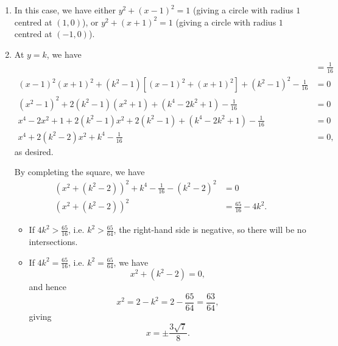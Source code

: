 \Question{\currfilebase}

\begin{enumerate}
    \item In this case, we have either \(y^2 + (x - 1)^2 = 1\) (giving a circle with radius \(1\) centred at \((1, 0)\)), or \(y^2 + (x + 1)^2 = 1\) (giving a circle with radius \(1\) centred at \((-1, 0)\)).
          \begin{center}
              
          \end{center}

    \item At \(y = k\), we have
          \begin{align*}
              [(x - 1)^2 + (k^2 - 1)] [(x + 1)^2 + (k^2 - 1)]                                      & = \frac{1}{16} \\
              (x - 1)^2 (x + 1)^2 + (k^2 - 1) [(x - 1)^2 + (x + 1)^2] + (k^2 - 1)^2 - \frac{1}{16} & = 0            \\
              (x^2 - 1)^2 + 2 (k^2 - 1) (x^2 + 1) + (k^4 - 2k^2 + 1) - \frac{1}{16}                & = 0            \\
              x^4 - 2x^2 + 1 + 2 (k^2 - 1) x^2 + 2 (k^2 - 1) + (k^4 - 2k^2 + 1) - \frac{1}{16}     & = 0            \\
              x^4 + 2 (k^2 - 2) x^2 + k^4 - \frac{1}{16}                                           & = 0,
          \end{align*}
          as desired.

          By completing the square, we have
          \begin{align*}
              (x^2 + (k^2 - 2))^2 + k^4 - \frac{1}{16} - (k^2 - 2)^2 & = 0                     \\
              (x^2 + (k^2 - 2))^2                                    & = \frac{65}{16} - 4k^2.
          \end{align*}

          \begin{itemize}
              \item If \(4k^2 > \frac{65}{16}\), i.e. \(k^2 > \frac{65}{64}\), the right-hand side is negative, so there will be no intersections.

              \item If \(4k^2 = \frac{65}{16}\), i.e. \(k^2 = \frac{65}{64}\), we have
                    \[
                        x^2 + (k^2 - 2) = 0,
                    \]
                    and hence
                    \[
                        x^2 = 2 - k^2 = 2 - \frac{65}{64} = \frac{63}{64},
                    \]
                    giving
                    \[
                        x = \pm \frac{3\sqrt{7}}{8}.
                    \]


\end{itemize}
\end{enumerate}
